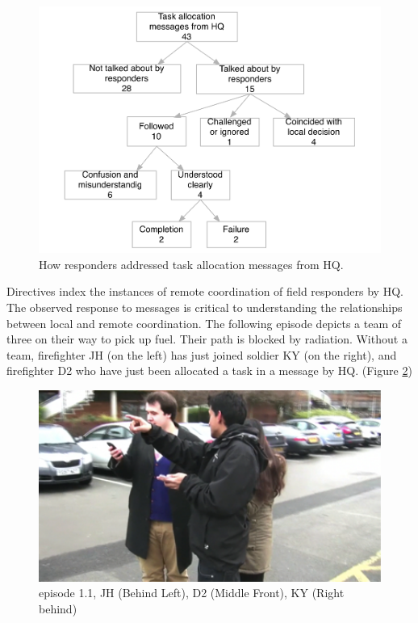 \begin{figure}[h]
  \centering
  \includegraphics[width=1\textwidth]{img/study1/instructions}
  \caption{How responders addressed task allocation messages from HQ.}
  \label{fig:study1instructions}
\end{figure}

Directives index the instances of remote coordination of field responders by HQ. The observed response to messages is critical to understanding the relationships between local and remote coordination. The following episode depicts a team of three on their way to pick up fuel. Their path is blocked by radiation. Without a team, firefighter JH (on the left) has just joined soldier KY (on the right), and firefighter D2 who have just been allocated a task in a message by HQ. (Figure \ref{fig:study1ep11})\\

\begin{figure}[h]
  \centering
  \includegraphics[width=1\textwidth]{img/study1/ep1/ep11}
  \caption{episode 1.1, JH (Behind Left), D2 (Middle Front), KY (Right behind)}
  \label{fig:study1ep11}
\end{figure}



